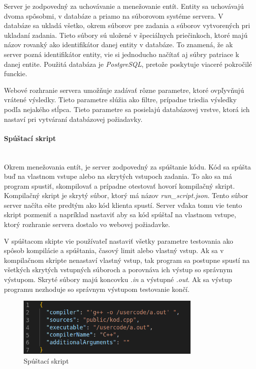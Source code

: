 Server je zodpovedný za uchovávanie a menežovanie entít. Entity sa uchovávajú dvoma spôsobmi, v
databáze a priamo na súborovom systéme servera. V databáze sa ukladá všetko, okrem súborov pre
zadania a súborov vytvorených pri ukladaní zadania. Tieto súbory sú uložené v špeciálnych
priečinkoch, ktoré majú názov rovanký ako identifikátor danej entity v databáze. To znamená, že
ak server pozná identifikátor entity, vie si jednoducho načítať aj súbry patriace k danej entite.
Použitá databáza je \textit{PostgreSQL}, pretože poskytuje viaceré pokročilé funckie.

Webové rozhranie servera umožňuje zadávať rôzne parametre, ktoré ovpľyvňujú vrátené výsledky. Tieto
parametre slúžia ako filtre, prípadne triedia výsledky podľa nejakého stĺpca. Tieto parametre sa
posielajú databázovej vrstve, ktorá ich nastaví pri vytváraní databázovej požiadavky.

\paragraph{Spúštací skript}\leavevmode\\
Okrem menežovania entít, je server zodpovedný za spúštanie kódu. Kód sa spúšta buď na vlastnom
vstupe alebo na skrytých vstupoch zadania. To ako sa má program spustiť, skompilovať a prípadne
otestovať hovorí kompilačný skript. Kompilačný skript je skrytý súbor, ktorý má názov
\textit{run\_script.json}. Tento súbor server načíta ešte predtým ako kód klienta spustí. Server
vďaka tomu vie tento skript pozmeniť a napríklad nastaviť aby sa kód spúštaľ na vlastnom vstupe,
ktorý rozhranie servera dostalo vo webovej požiadavke. 

V spúštacom skipte vie používateľ nastaviť všetky parametre testovania ako spôsob kompilácie a
spúštania, časový limit alebo vlastný vstup. Ak sa v kompilačnom skripte nenastaví vlastný vstup,
tak program sa postupne spustí na všetkých skrytých vstupných súboroch a porovnáva ich výstup so
správnym výstupom. Skryté súbory majú koncovku \textit{.in} a výstupné \textit{.out}. Ak sa výstup
programu nezhoduje so správnym výstupom
testovanie končí.
\begin{figure}[H]
\centerline{\includegraphics[width=0.8\textwidth]{images/spustaci_skript}}
\caption[Spúštací skript]{Spúštací skript}
\label{obr:zadania}
\end{figure}

